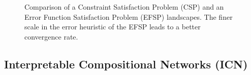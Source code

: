 \documentclass{juliacon}
\newcommand{\efsp}{\textsc{EFSP}\xspace}
\begin{document}
\begin{figure}[t]
  \centering

  \caption{
    Comparison of a Constraint Satisfaction Problem (CSP) and an Error
    Function Satisfaction Problem (\efsp) landscapes. The finer scale
    in the error heuristic of the \efsp leads to a better convergence
    rate.}\label{fig:landscape}
\end{figure}

\subsection{Interpretable Compositional Networks (ICN)}
\label{subsec:icn}
\end{document}
